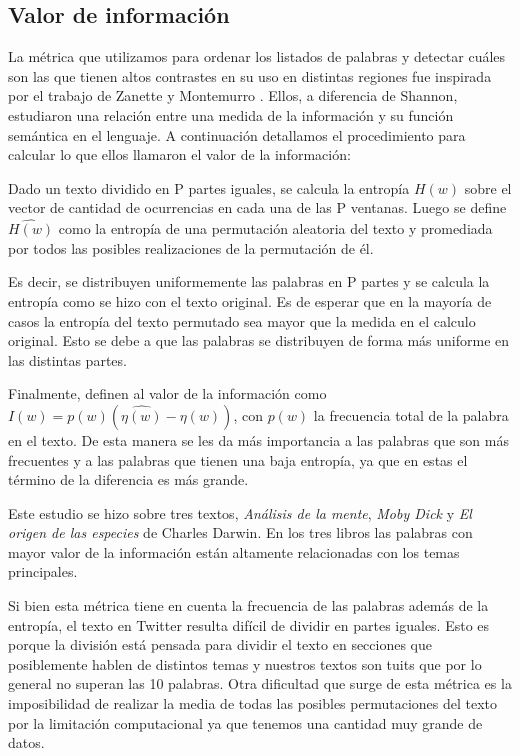 \subsection{Valor de información}
La métrica que utilizamos para ordenar los listados de palabras y detectar cuáles son
las que tienen altos contrastes en su uso en distintas regiones fue inspirada por el
trabajo de Zanette y Montemurro \cite{montemurro2010towards}.
Ellos, a diferencia de Shannon, estudiaron una relación entre una medida de la información y su función semántica en el lenguaje.
A continuación detallamos el procedimiento para calcular lo que ellos llamaron
el valor de la información:

Dado un texto dividido en P partes iguales, se calcula la entropía  $H(w)$ sobre el vector de cantidad de ocurrencias en cada una de las P ventanas.
Luego se define $\widehat{H(w)}$  como la entropía de una permutación aleatoria del texto y promediada por todos las posibles realizaciones de la permutación de él. 

Es decir, se distribuyen uniformemente las palabras en P partes y se calcula la
entropía como se hizo con el texto original. Es de esperar que en la mayoría de casos 
la entropía del texto permutado sea mayor que la medida en el calculo original. Esto 
se debe a que las palabras se distribuyen de forma más uniforme 
en las distintas partes.

Finalmente, definen al valor de la información como $I(w) = p(w) (\widehat{\eta(w)} - \eta(w))$, con $p(w)$ la frecuencia total de la palabra en el texto. 
De esta manera se les da más importancia a las palabras que son más frecuentes y a las palabras que tienen una baja entropía, ya que en estas el término de la diferencia es más grande.

Este estudio se hizo sobre tres textos, \textit{Análisis de la mente}, 
\textit{Moby Dick} y \textit{El origen de las especies} de Charles Darwin. 
En los tres libros las palabras con mayor valor de la información están 
altamente relacionadas con los temas principales.

Si bien esta métrica tiene en cuenta la frecuencia de las palabras además de la 
entropía, el texto en Twitter resulta difícil de dividir en partes iguales. 
Esto es porque la división está pensada para dividir el texto en secciones que 
posiblemente hablen de distintos temas y nuestros textos son tuits que por lo general no superan las 10 palabras.
Otra dificultad que surge de esta métrica es la imposibilidad de realizar la media 
de todas las posibles permutaciones del texto por la limitación computacional ya que 
tenemos una cantidad muy grande de datos.


